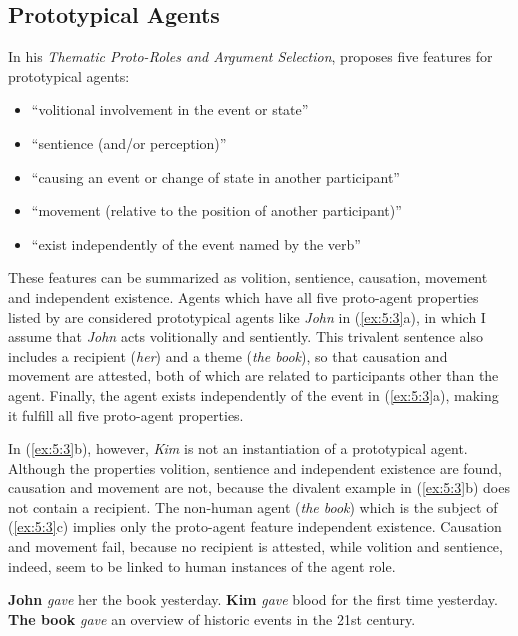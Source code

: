 \documentclass[output=paper]{LSP/langsci}
\begin{document}
\subsection{Prototypical Agents} \label{sec:5:2:1}
In his \textit{Thematic Proto-Roles and Argument Selection}, \citet[572]{Dowty1991} proposes five features for prototypical agents:

\begin{itemize}
\item “volitional involvement in the event or state”
\item “sentience (and/or perception)”
\item “causing an event or change of state in another participant”
\item “movement (relative to the position of another participant)”
\item “exist independently of the event named by the verb”
\end{itemize}

These features can be summarized as volition, sentience, causation, movement and independent existence. Agents which have all five proto-agent properties listed by \citet{Dowty1991} are considered prototypical agents like \textit{John} in (\ref{ex:5:3}a), in which I assume that \textit{John} acts volitionally and sentiently. This trivalent sentence also includes a recipient (\textit{her}) and a theme (\textit{the book}), so that causation and movement are attested, both of which are related to participants other than the agent. Finally, the agent exists independently of the event in (\ref{ex:5:3}a), making it fulfill all five proto-agent properties.

In (\ref{ex:5:3}b), however, \textit{Kim} is not an instantiation of a prototypical agent. Although the properties volition, sentience and independent existence are found, causation and movement are not, because the divalent example in (\ref{ex:5:3}b) does not contain a recipient. The non-human agent (\textit{the book}) which is the subject of (\ref{ex:5:3}c) implies only the proto-agent feature independent existence. Causation and movement fail, because no recipient is attested, while volition and sentience, indeed, seem to be linked to human instances of the agent role.\newline 

\ea \label{ex:5:3}
\ea \textbf{John} \textit{gave} her the book yesterday.
\ex \textbf{Kim} \textit{gave} blood for the first time yesterday.
\ex \textbf{The book} \textit{gave} an overview of historic events in the 21st century.
\z
\z
\end{document}
